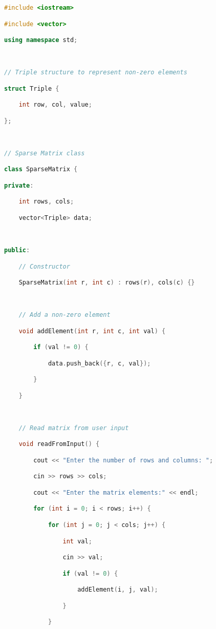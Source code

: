 \begin{lstlisting}[language=C++]
#include <iostream>

#include <vector>

using namespace std;

  

// Triple structure to represent non-zero elements

struct Triple {

    int row, col, value;

};

  

// Sparse Matrix class

class SparseMatrix {

private:

    int rows, cols;

    vector<Triple> data;

  

public:

    // Constructor

    SparseMatrix(int r, int c) : rows(r), cols(c) {}

  

    // Add a non-zero element

    void addElement(int r, int c, int val) {

        if (val != 0) {

            data.push_back({r, c, val});

        }

    }

  

    // Read matrix from user input

    void readFromInput() {

        cout << "Enter the number of rows and columns: ";

        cin >> rows >> cols;

        cout << "Enter the matrix elements:" << endl;

        for (int i = 0; i < rows; i++) {

            for (int j = 0; j < cols; j++) {

                int val;

                cin >> val;

                if (val != 0) {

                    addElement(i, j, val);

                }

            }


\end{lstlisting}
